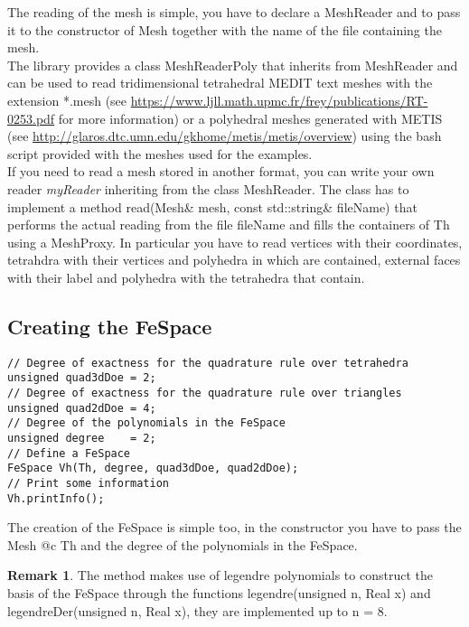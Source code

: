 \documentclass[12pt, a4paper]{article}
\newcommand{\code}[1]{{\footnotesize\ttfamily #1}}
\theoremstyle{definition}
\newtheorem*{remark}{Remark}
\begin{document}
The reading of the mesh is simple, you have to declare a \code{MeshReader} and
to pass it to the constructor of \code{Mesh} together with the name of the file
containing the mesh.\\
The library provides a class \code{MeshReaderPoly} that inherits from 
\code{MeshReader} and can be used to read tridimensional tetrahedral MEDIT text 
meshes with the extension *.mesh (see 
\url{https://www.ljll.math.upmc.fr/frey/publications/RT-0253.pdf} for more 
information) or a polyhedral meshes generated with METIS (see 
\url{http://glaros.dtc.umn.edu/gkhome/metis/metis/overview}) using the bash
script provided with the meshes used for the examples.\\
If you need to read a mesh stored in another format, you can write your own
reader \emph{myReader} inheriting from the class \code{MeshReader}. The class 
has to implement a method \code{read(Mesh\& mesh, const std::string\& 
fileName)} that performs the actual reading from the file \code{fileName} and 
fills the containers of \code{Th} using a \code{MeshProxy}. In particular you 
have to read vertices with their coordinates, tetrahdra with their vertices and 
polyhedra in which are contained, external faces with their label and polyhedra 
with the tetrahedra that contain.\\
\subsection{Creating the FeSpace}
\begin{lstlisting}
// Degree of exactness for the quadrature rule over tetrahedra
unsigned quad3dDoe = 2;
// Degree of exactness for the quadrature rule over triangles
unsigned quad2dDoe = 4;
// Degree of the polynomials in the FeSpace
unsigned degree    = 2;
// Define a FeSpace
FeSpace Vh(Th, degree, quad3dDoe, quad2dDoe);
// Print some information
Vh.printInfo();
\end{lstlisting}

The creation of the FeSpace is simple too, in the constructor you have to pass	
the Mesh @c Th and the degree of the polynomials in the FeSpace.\\

\begin{remark}
The method makes use of legendre polynomials to construct the basis of the
FeSpace through the functions \code{legendre(unsigned n, Real x)} and 
\code{legendreDer(unsigned n, Real x)},	they are implemented up to \code{n = 
8}.
\end{remark}
\end{document}
